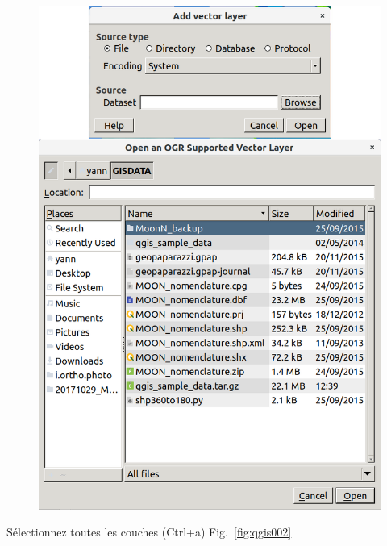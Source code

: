 \begin{figure}[htbp]
   \centering
   \includegraphics[scale=0.3]{qgis001.png}
   \caption{}
   \label{fig:qgis001}
\end{figure}

S\'electionnez toutes les couches (Ctrl+a) Fig.~\ref{fig:qgis002}

